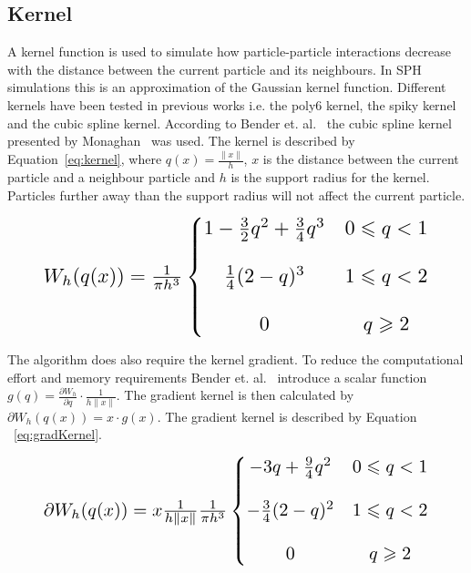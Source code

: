 \subsection{Kernel} \label{kernel}
    A kernel function is used to simulate how particle-particle interactions decrease with the distance between the current particle and its neighbours. In SPH simulations this is an approximation of the Gaussian kernel function. Different kernels have been tested in previous works i.e. the poly6 kernel, the spiky kernel and the cubic spline kernel. According to Bender et. al.~\cite{bender} the cubic spline kernel presented by Monaghan~\cite{monaghan} was used. The kernel is described by Equation~\ref{eq:kernel}, where $q(x)=\frac{\left \| x \right \|}{h}$, $x$ is the distance between the current particle and a neighbour particle and $h$ is the support radius for the kernel. Particles further away than the support radius will not affect the current particle.   

    \begin{equation} \label{eq:kernel}
        \resizebox{0.88\linewidth}{!}{$
        W_h(q(x)) =  \frac{1}{\pi h^3} \left\{\begin{matrix}
        1 - \frac{3}{2}q^2 + \frac{3}{4}q^3 & 0 \leqslant q < 1 \\ 
        \\
        \frac{1}{4}(2-q)^3 & 1 \leqslant q < 2\\ 
        \\
        0 & q \geqslant 2
        \end{matrix}\right.
        $}
    \end{equation}

    The algorithm does also require the kernel gradient. To reduce the computational effort and memory requirements Bender et. al.~\cite{bender} introduce a scalar function $g(q) = \frac{\partial W_h}{\partial q} \cdot \frac{1}{h \left \| x \right \|}$. The gradient kernel is then calculated by $\partial W_h(q(x)) = x \cdot g(x)$. The gradient kernel is described by Equation ~\ref{eq:gradKernel}. 


    \begin{equation} \label{eq:gradKernel}
        \resizebox{0.88\linewidth}{!}{$
        \partial W_h(q(x)) =  x \frac{1}{h \left \| x \right \|} \frac{1}{\pi h^3} \left\{\begin{matrix}
        - 3q + \frac{9}{4}q^2 & 0 \leqslant q < 1 \\ 
        \\
        - \frac{3}{4}(2-q)^2 & 1 \leqslant q < 2\\ 
        \\
        0 & q \geqslant 2
        \end{matrix}\right.
        $}
    \end{equation}

